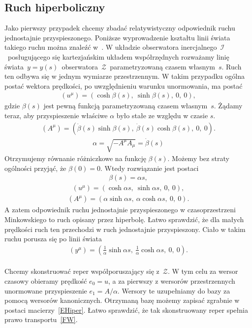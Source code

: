 \subsection{Ruch hiperboliczny}
Jako pierwszy przypadek chcemy zbadać relatywistyczny 
odpowiednik ruchu jednostajnie 
przyspieszonego.
Poniższe wyprowadzenie kształtu linii 
świata takiego ruchu można znaleźć 
w~\cite{trau1984, Ashtekar20141}.
W układzie obserwatora inercjalnego~$\mathcal{I}$~posługującego się 
kartezjańskim układem współrzędnych rozważamy linię 
świata~$y=y(s)$~obserwatora~$\mathcal{Z}$~parametryzowaną 
czasem własnym~$s$.
Ruch ten odbywa się w jednym wymiarze przestrzennym. 
W takim przypadku ogólna postać wektora prędkości, 
po uwzględnieniu warunku 
unormowania, ma postać
\begin{align}\label{UHiper}
(u^\mu) = (\cosh \beta( s ),\ \sinh \beta( s ),\ 0,\   0),
\end{align}
gdzie $\beta( s)$ jest pewną funkcją parametryzowaną czasem własnym~$s$.
Żądamy teraz, 
aby przyspieszenie właściwe $\alpha$ 
było stałe ze względu w czasie $s$. 
\begin{align}\nonumber
(A^\mu) = ( \dot{\beta}( s ) \sinh \beta( s ),\ 
\dot{\beta}( s ) \cosh \beta( s ),\ 0,\ 0 ).
\end{align}
\begin{align}\nonumber
\alpha = \sqrt{ - A^\mu A_\mu } = \dot{\beta}( s )
\end{align}
Otrzymujemy równanie różniczkowe na funkcję $\beta(s)$. 
Możemy bez straty ogólności przyjąć, że $\beta(0)  = 0$. 
Wtedy rozwiązanie jest postaci
\begin{align}\nonumber
\beta( s ) = \alpha s,
\end{align}
\begin{align}\nonumber
(u^\mu) = (\cosh \alpha s ,\ \sinh \alpha s ,\ 0,\   0),
\end{align}
\begin{align}\nonumber
(A^\mu) = ( \alpha \sinh \alpha s,\ \alpha \cosh \alpha s,\ 0,\ 0 ).
\end{align}
A zatem odpowiednik ruchu jednostajnie przyspieszonego w
czasoprzestrzeni Minkowskiego to ruch opisany przez hiperbolę.
Łatwo sprawdzić, że dla małych prędkości ruch ten przechodzi 
w ruch jednostajnie przyspieszony. Ciało w takim ruchu porusza
się po linii świata
\begin{align}\label{YHiper}
(y^\mu) = \left( \frac{1}{\alpha} \sinh \alpha s,\ 
\frac{1}{\alpha} \cosh \alpha s,\ 0,\ 0 \right).
\end{align}
\\
Chcemy skonstruować reper współporuszający się z~$\mathcal{Z}$. 
W tym celu za wersor czasowy obieramy prędkość $e_0 = u$, 
a za pierwszy z wersorów przestrzennych unormowane 
przyspieszenie $e_1 = A/\alpha$.
Wersory te uzupełniamy do bazy za pomocą wersorów kanonicznych.
Otrzymaną bazę możemy zapisać zgrabnie w postaci 
macierzy~\eqref{EHiper}.
Łatwo sprawdzić, że tak skonstruowany reper spełnia
prawo transportu~\eqref{FW}.

